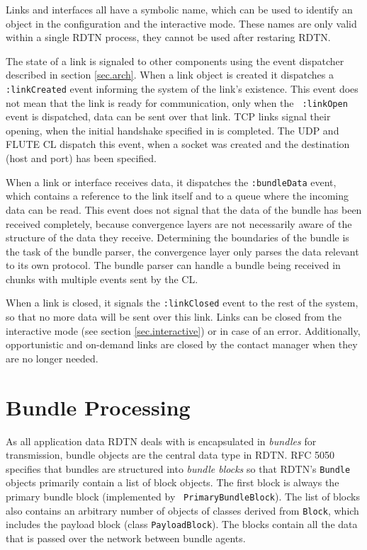 \documentclass[a4paper]{article}
\begin{document}
Links and interfaces all have a symbolic name, which can be used to identify an
object in the configuration and the interactive mode. These names are only valid
within a single RDTN process, they cannot be used after restaring RDTN.

The state of a link is signaled to other components using the event dispatcher
described in section \ref{sec.arch}. When a link object is created it dispatches
a {\tt :linkCreated} event informing the system of the link's existence. This
event does not mean that the link is ready for communication, only when the {\tt
:linkOpen} event is dispatched, data can be sent over that link. TCP links
signal their opening, when the initial handshake specified in \cite{dtn-tcp-cl} is
completed. The UDP and FLUTE CL dispatch this event, when a socket was created
and the destination (host and port) has been specified.

When a link or interface receives data, it dispatches the {\tt :bundleData}
event, which contains a reference to the link itself and to a queue where the
incoming data can be read. This event does not signal that the data of the
bundle has been received completely, because convergence layers are not
necessarily aware of the structure of the data they receive. Determining the
boundaries of the bundle is the task of the bundle parser, the convergence layer
only parses the data relevant to its own protocol. The bundle parser can
handle a bundle being received in chunks with multiple events sent by
the CL.

When a link is closed, it signals the {\tt :linkClosed} event to the rest of the
system, so that no more data will be sent over this link. Links can be closed
from the interactive mode (see section \ref{sec.interactive}) or in case of an
error. Additionally, opportunistic and on-demand links are closed by the contact
manager when they are no longer needed.

\section{Bundle Processing}\label{sec.bundle-proc}

As all application data RDTN deals with is encapsulated in {\em bundles} for
transmission, bundle objects are the central data type in RDTN. RFC 5050
\cite{bundle-spec} specifies that bundles are structured into {\em bundle
blocks} so that RDTN's {\tt Bundle} objects primarily contain a list of block
objects. The first block is always the primary bundle block (implemented by {\tt
PrimaryBundleBlock}). The list of blocks also contains an arbitrary number of
objects of classes derived from {\tt Block}, which includes the payload block
(class {\tt PayloadBlock}). The blocks contain all the data that is passed over
the network between bundle agents. 
\end{document}
